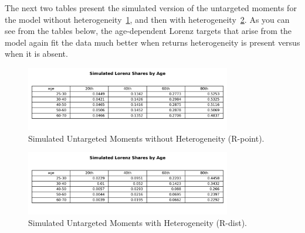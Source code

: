 \par The next two tables present the simulated version of the untargeted moments for the model without heterogeneity~\ref{fig:SimLorenzTarPoint}, and then with heterogeneity~\ref{fig:SimLorenzTarDist}. As you can see from the tables below, the age-dependent Lorenz targets that arise from the model again fit the data much better when returns heterogeneity is present versus when it is absent.

\begin{figure}[htbp]
\centering
\includegraphics[width=0.8\textwidth]{Tables/Sim_Lorenz_by_age_Unif_LCrrPointNetWorth_2004.png}
\caption{Simulated Untargeted Moments without Heterogeneity (R-point).}
\label{fig:SimLorenzTarPoint}
\end{figure}

\begin{figure}[htbp]
\centering
\includegraphics[width=0.8\textwidth]{Tables/Sim_Lorenz_by_age_Unif_LCrrDistNetWorth_2004.png}
\caption{Simulated Untargeted Moments with Heterogeneity (R-dist).}
\label{fig:SimLorenzTarDist}
\end{figure}





